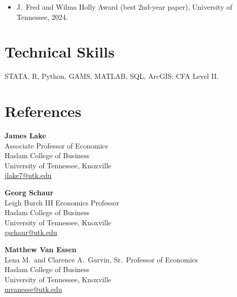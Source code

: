 \documentclass[11pt]{article}
\begin{document}
\begin{itemize}
  \item J.\ Fred and Wilma Holly Award (best 2nd-year paper), University of Tennessee, 2024.
\end{itemize}

\section*{Technical Skills}

STATA, R, Python, GAMS, MATLAB, SQL, ArcGIS; CFA Level II.

\section*{References}

\vspace{4pt}
\noindent
\begin{minipage}[t]{0.48\textwidth}
  \textbf{James Lake}\\
  Associate Professor of Economics\\
  Haslam College of Business\\
  University of Tennessee, Knoxville\\
  \href{mailto:jlake7@utk.edu}{jlake7@utk.edu}
\end{minipage}\hfill
\begin{minipage}[t]{0.48\textwidth}
  \textbf{Georg Schaur}\\
  Leigh Burch III Economics Professor\\
  Haslam College of Business\\
  University of Tennessee, Knoxville\\
  \href{mailto:gschaur@utk.edu}{gschaur@utk.edu}
\end{minipage}

\vspace{16pt}

\noindent
\begin{minipage}[t]{0.48\textwidth}
  \textbf{Matthew Van Essen}\\
  Lena M.\ and Clarence A.\ Garvin, Sr.\ Professor of Economics\\
  Haslam College of Business\\
  University of Tennessee, Knoxville\\
  \href{mailto:mvanesse@utk.edu}{mvanesse@utk.edu}
\end{minipage}
\end{document}
